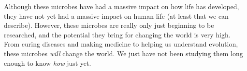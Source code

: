 \documentclass[twocolumn]{article}
\begin{document}
    Although these microbes have had a massive impact on how life has developed, they have not yet had a massive impact on human life (at least that we can describe). However, these microbes are really only just beginning to be researched, and the potential they bring for changing the world is very high. From curing diseases and making medicine to helping us understand evolution, these microbes \textit{will} change the world. We just have not been studying them long enough to know \textit{how} just yet.


\printbibliography
\end{document}
